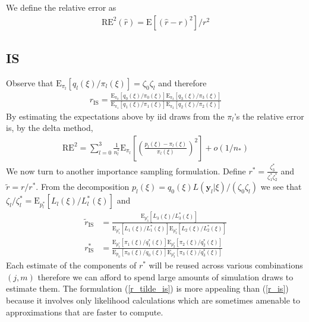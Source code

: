 We define the relative error as
\begin{align}
\mathrm{RE}^2(\hat r)=\mathrm{E}[(\hat r-r)^2]/r^2
\end{align}

\subsection{IS}
Observe that 
$\mathrm{E}_{\pi_l}[q_l(\xi)/\pi_l(\xi)]=\zeta_0\zeta_l$ and therefore
\begin{align}\label{r_is}
r_{\mathrm{IS}}=\frac{\mathrm{E}_{\pi_0}[q_{0}(\xi)/\pi_0(\xi)]\mathrm{E}_{\pi_3}[q_{3}(\xi)/\pi_3(\xi)]}{\mathrm{E}_{\pi_1}[q_{1}(\xi)/\pi_1(\xi)]\mathrm{E}_{\pi_2}[q_{2}(\xi)/\pi_2(\xi)]}
\end{align}By estimating the expectations above by iid draws from the $\pi_l$'s the relative error is, by the delta method,
\begin{align}
\mathrm{RE}^2= \sum_{l=0}^3\frac{1}{n_l^*}\mathrm{E}_{\pi_l}[\left(\frac{p_{l}(\xi)-{\pi}_l(\xi)}{{\pi}_l(\xi)}\right)^2]+o(1/n_*)
\end{align}
We now turn to another importance sampling formulation. Define $r^*=\frac{\zeta_{3}^*}{\zeta_{1}^*\zeta_{2}^*}$ and $\tilde r=r/r^*$. From the decomposition $p_l(\xi)=q_0(\xi)L(\mathbf{y}_l|\xi)/(\zeta_0 \zeta_l)$ we see that $\zeta_l/\zeta_l^*=\mathrm{E}_{p_l^*}[L_l(\xi)/L_l^*(\xi)]$ and
\begin{align}
\label{r_tilde_is}
\tilde{r}_{\mathrm{IS}}&=\frac{\mathrm{E}_{p_3^*}[L_{3}(\xi)/L^*_3(\xi)]}{\mathrm{E}_{p_1^*}[L_{1}(\xi)/L^*_1(\xi)]\mathrm{E}_{p_2^*}[L_{2}(\xi)/L^*_2(\xi)]}\\\label{r_star_is}
r^*_{\mathrm{IS}}&=\frac{\mathrm{E}_{p_1^*}[\pi_1(\xi)/q_1^*(\xi)]\mathrm{E}_{p_2^*}[\pi_2(\xi)/q_2^*(\xi)]}{\mathrm{E}_{p_0}[\pi_0(\xi)/q_{0}(\xi)]\mathrm{E}_{p_3^*}[\pi_3(\xi)/q_3^*(\xi)]}
\end{align}Each estimate of the components of $r^*$ will be reused across various combinations $(j,m)$ therefore we can afford to spend large amounts of simulation draws to estimate them. The formulation (\ref{r_tilde_is}) is more appealing than (\ref{r_is}) because it involves only likelihood calculations which are sometimes amenable to approximations that are faster to compute.

